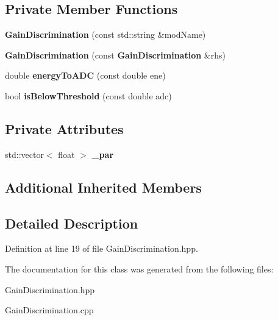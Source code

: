 \subsection*{Private Member Functions}
\begin{DoxyCompactItemize}
\item 
{\bfseries Gain\-Discrimination} (const std\-::string \&mod\-Name)\label{classdigisim_1_1GainDiscrimination_abe382c5a7a32de7112b11698621d1245}

\item 
{\bfseries Gain\-Discrimination} (const {\bf Gain\-Discrimination} \&rhs)\label{classdigisim_1_1GainDiscrimination_a79702158c3183fecee7a6af2642be64b}

\item 
double {\bfseries energy\-To\-A\-D\-C} (const double ene)\label{classdigisim_1_1GainDiscrimination_ae2608651731ebb223b5485664b9e8376}

\item 
bool {\bfseries is\-Below\-Threshold} (const double adc)\label{classdigisim_1_1GainDiscrimination_a37f25c0a56cef0267c0b1add4c1da88d}

\end{DoxyCompactItemize}
\subsection*{Private Attributes}
\begin{DoxyCompactItemize}
\item 
std\-::vector$<$ float $>$ {\bfseries \-\_\-par}\label{classdigisim_1_1GainDiscrimination_a87163c1aaea57d296163d82f66d0f654}

\end{DoxyCompactItemize}
\subsection*{Additional Inherited Members}


\subsection{Detailed Description}


Definition at line 19 of file Gain\-Discrimination.\-hpp.



The documentation for this class was generated from the following files\-:\begin{DoxyCompactItemize}
\item 
Gain\-Discrimination.\-hpp\item 
Gain\-Discrimination.\-cpp\end{DoxyCompactItemize}
